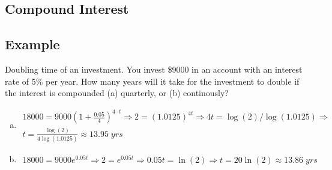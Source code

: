 \documentclass{tufte-handout}
\begin{document}
\subsection{Compound Interest}

\subsection{Example}
Doubling time of an investment.
You invest \$9000 in an account with an interest rate of 5\% per year.
How many years will it take for the investment to double if the interest is compounded (a) quarterly, or (b) continously?
\begin{enumerate}[(a)]
\item \begin{align*}
18000 = 9000 \left( 1 + \frac{0.05}{4} \right)^{4\cdot t} \Rightarrow
2 = (1.0125)^{4t} \Rightarrow
4t = \log(2)/\log(1.0125) \Rightarrow \\
t = \frac{\log(2)}{4\log(1.0125)}
\approx 13.95 \; yrs
\end{align*}
\item  \begin{align*}
18000 = 9000 e^{0.05t} \Rightarrow
2 = e^{0.05t} \Rightarrow
0.05t = \ln(2) \Rightarrow
t = 20\ln(2) \approx 13.86 \; yrs
\end{align*}
\end{enumerate}
\end{document}
